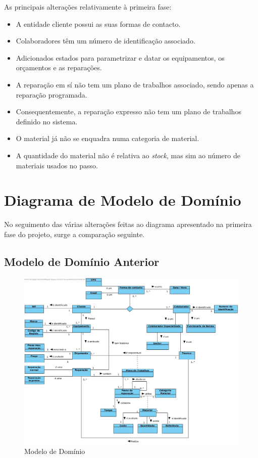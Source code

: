 \documentclass[a4paper,12pt]{scrreprt}
\begin{document}
As principais alterações relativamente à primeira fase: 
\begin{itemize}
    \item A entidade cliente possui as suas formas de contacto.
    \item Colaboradores têm um número de identificação associado. 
    \item Adicionados estados para parametrizar e datar os equipamentos, os orçamentos e as reparações.
    \item A reparação em sí não tem um plano de trabalhos associado, sendo apenas a reparação programada.
    \item Consequentemente, a reparação expresso não tem um plano de trabalhos definido no sistema.
    \item O material já não se enquadra numa categoria de material.
    \item A quantidade do material não é relativa ao \textit{stock}, mas sim ao número de materiais usados no passo.
\end{itemize}

\section{Diagrama de Modelo de Domínio}

No seguimento das várias alterações feitas ao diagrama apresentado na primeira fase do projeto, surge a comparação seguinte.

\subsection{Modelo de Domínio Anterior} 

\begin{figure}[!ht]
    \centering
    \includegraphics[scale=0.40]{Modeloinicial.jpg}
    \caption{Modelo de Domínio}
\end{figure}
\end{document}
